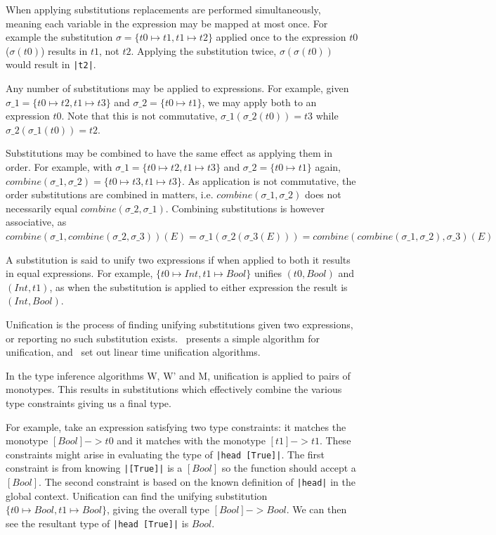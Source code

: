 \documentclass[a4paper,fleqn,12pt]{article}
\begin{document}
When applying substitutions replacements are performed simultaneously, meaning each variable in the expression may be mapped at most once. For example the substitution $\sigma = \{ t0 \mapsto t1, t1 \mapsto t2 \}$ applied once to the expression $t0$ ($\sigma(t0)$) results in $t1$, not $t2$. Applying the substitution twice, $\sigma(\sigma(t0))$ would result in \texttt{|t2|}.

Any number of substitutions may be applied to expressions. For example, given $\sigma\_1 = \{ t0 \mapsto t2, t1 \mapsto t3 \}$ and $\sigma\_2 = \{ t0 \mapsto t1 \}$, we may apply both to an expression $t0$. Note that this is not commutative, $\sigma\_1(\sigma\_2(t0)) = t3$ while $\sigma\_2(\sigma\_1(t0)) = t2$.

Substitutions may be combined to have the same effect as applying them in order. For example, with $\sigma\_1 = \{ t0 \mapsto t2, t1 \mapsto t3 \}$ and $\sigma\_2 = \{ t0 \mapsto t1 \}$ again, $combine(\sigma\_1, \sigma\_2) = \{ t0 \mapsto t3, t1 \mapsto t3 \}$. As application is not commutative, the order substitutions are combined in matters, i.e. $combine(\sigma\_1, \sigma\_2)$ does not necessarily equal $combine(\sigma\_2, \sigma\_1)$. Combining substitutions is however associative, as $combine(\sigma\_1, combine(\sigma\_2, \sigma\_3))(E) = \sigma\_1(\sigma\_2(\sigma\_3(E))) = combine(combine(\sigma\_1, \sigma\_2), \sigma\_3)(E)$

A substitution is said to unify two expressions if when applied to both it results in equal expressions. For example, $\{ t0 \mapsto Int, t1 \mapsto Bool \}$ unifies $(t0, Bool)$ and $(Int, t1)$, as when the substitution is applied to either expression the result is $(Int, Bool)$.

Unification is the process of finding unifying substitutions given two expressions, or reporting no such substitution exists.~\cite{ref29} presents a simple algorithm for unification, and~\cite{ref30,ref31} set out linear time unification algorithms.

In the type inference algorithms W, W’ and M, unification is applied to pairs of monotypes. This results in substitutions which effectively combine the various type constraints giving us a final type.

For example, take an expression satisfying two type constraints: it matches the monotype $[Bool] -> t0$ and it matches with the monotype $[t1] -> t1$. These constraints might arise in evaluating the type of \texttt{|head [True]|}. The first constraint is from knowing \texttt{|[True]|} is a $[Bool]$ so the function should accept a $[Bool]$. The second constraint is based on the known definition of \texttt{|head|} in the global context. Unification can find the unifying substitution $\{ t0 \mapsto Bool, t1 \mapsto Bool \}$, giving the overall type $[Bool] -> Bool$. We can then see the resultant type of \texttt{|head [True]|} is $Bool$.
\end{document}
